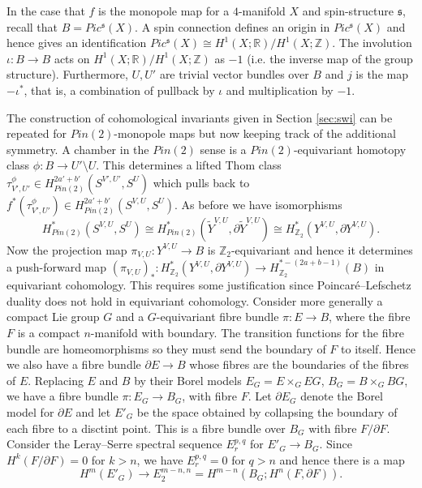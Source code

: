 \documentclass{amsart}
\theoremstyle{definition}
\theoremstyle{remark}
\numberwithin{equation}{section}
\begin{document}
In the case that $f$ is the monopole map for a $4$-manifold $X$ and spin-structure $\mathfrak{s}$, recall that $B = Pic^{\mathfrak{s}}(X)$. A spin connection defines an origin in $Pic^{\mathfrak{s}}(X)$ and hence gives an identification $Pic^{\mathfrak{s}}(X) \cong H^1(X ; \mathbb{R})/H^1(X ; \mathbb{Z})$. The involution $\iota : B \to B$ acts on $H^1(X ; \mathbb{R})/H^1(X ; \mathbb{Z})$ as $-1$ (i.e. the inverse map of the group structure). Furthermore, $U,U'$ are trivial vector bundles over $B$ and $j$ is the map $-\iota^*$, that is, a combination of pullback by $\iota$ and multiplication by $-1$.

The construction of cohomological invariants given in Section \ref{sec:swi} can be repeated for $Pin(2)$-monopole maps but now keeping track of the additional symmetry. A chamber in the $Pin(2)$ sense is a $Pin(2)$-equivariant homotopy class $\phi : B \to U' \setminus U$. This determines a lifted Thom class $\tau^\phi_{V',U'} \in H_{Pin(2)}^{2a'+b'}( S^{V',U'} , S^{U})$ which pulls back to $f^*(\tau^\phi_{V',U'}) \in H_{Pin(2)}^{2a'+b'}( S^{V,U} , S^U)$. As before we have isomorphisms
\[
H^*_{Pin(2)}(S^{V,U} , S^U) \cong H^*_{Pin(2)}( \widetilde{Y}^{V,U} , \partial \widetilde{Y}^{V,U}) \cong H^*_{\mathbb{Z}_2}( Y^{V,U} , \partial Y^{V,U}).
\]
Now the projection map $\pi_{V,U} : Y^{V,U} \to B$ is $\mathbb{Z}_2$-equivariant and hence it determines a push-forward map $(\pi_{V,U})_* : H^*_{\mathbb{Z}_2}( Y^{V,U} , \partial Y^{V,U} ) \to H^{*-(2a+b-1)}_{\mathbb{Z}_2}(B)$ in equivariant cohomology. This requires some justification since Poincar\'e--Lefschetz duality does not hold in equivariant cohomology. Consider more generally a compact Lie group $G$ and a $G$-equivariant fibre bundle $\pi : E \to B$, where the fibre $F$ is a compact $n$-manifold with boundary. The transition functions for the fibre bundle are homeomorphisms so they must send the boundary of $F$ to itself. Hence we also have a fibre bundle $\partial E \to B$ whose fibres are the boundaries of the fibres of $E$. Replacing $E$ and $B$ by their Borel models $E_G = E \times_G EG$, $B_G = B \times_G BG$, we have a fibre bundle $\pi : E_G \to B_G$, with fibre $F$. Let $\partial E_G$ denote the Borel model for $\partial E$ and let $E'_G$ be the space obtained by collapsing the boundary of each fibre to a disctint point. This is a fibre bundle over $B_G$ with fibre $F/\partial F$. Consider the Leray--Serre spectral sequence $E_r^{p,q}$ for $E'_G \to B_G$. Since $H^k( F/\partial F) = 0$ for $k > n$, we have $E_r^{p,q} = 0$ for $q > n$ and hence there is a map 
\[
H^m( E'_G ) \to E_2^{m-n , n} = H^{m-n}( B_G ; H^n( F , \partial F) ).
\]
\end{document}

